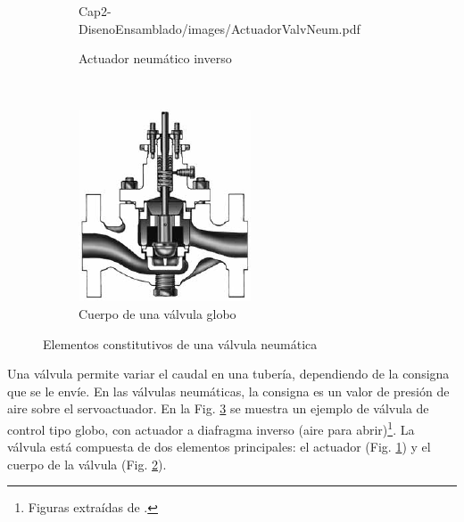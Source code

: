 \begin{figure}[t]
\begin{subfigure}[b]{0.37\textwidth}
	{Cap2-DisenoEnsamblado/images/ActuadorValvNeum.pdf}
                \caption{Actuador neumático inverso}
                \label{fig:actuadorValv}
        \end{subfigure}%
        ~
        \begin{subfigure}[b]{0.37\textwidth}
\includegraphics[width=\textwidth]{Cap2-DisenoEnsamblado/images/ValvGlob.pdf}
                \caption{Cuerpo de una válvula globo}
                \label{fig:cuerpoValv}
        \end{subfigure}
        \caption{Elementos constitutivos de una válvula neumática}
        \label{fig:elementosValv}
\end{figure}

Una válvula permite variar el caudal en una tubería, dependiendo de la consigna
que se le envíe.
En las válvulas neumáticas, la consigna es un valor de presión de aire sobre el
servoactuador.
En la Fig. \ref{fig:elementosValv} se muestra un ejemplo de válvula de control
tipo globo, con actuador a diafragma inverso (aire para
abrir)\footnote{Figuras extraídas de \cite{bib:controlValveHandbook}.}.
La válvula está compuesta de dos elementos principales: el actuador
(Fig. \ref{fig:actuadorValv}) y el cuerpo de la válvula (Fig.
\ref{fig:cuerpoValv}).

